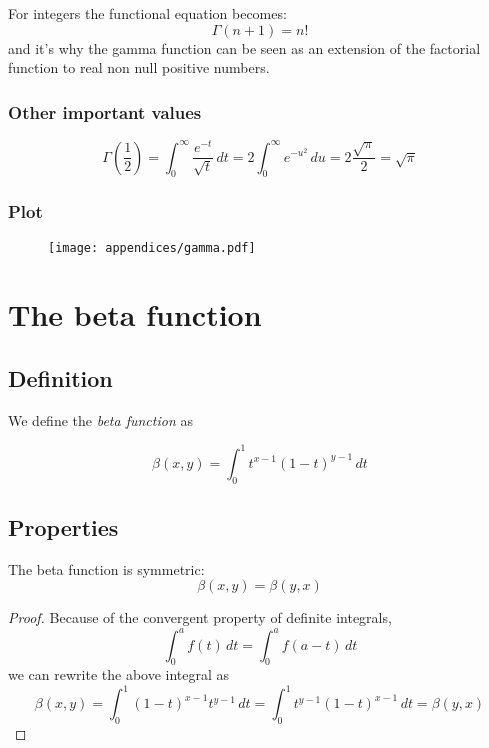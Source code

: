 For integers the functional equation becomes:
\[
    \Gamma(n + 1) = n!
\]
and it’s why the gamma function can be seen as an extension of the factorial function to real non null positive numbers.

\subsubsection{Other important values}

\[
    \Gamma\left(\frac{1}{2}\right) = \int_0^\infty \frac{e^{-t}}{\sqrt{t}} \, dt = 2\int_0^\infty e^{-u^2} \, du = 2 \frac{\sqrt{\pi}}{2} = \sqrt{\pi}
\]

\subsubsection{Plot}

\begin{figure}[H]
    \centering
	\texttt{[image: appendices/gamma.pdf]}
\end{figure}

\section{The beta function}

\subsection{Definition}

We define the \textit{beta function} as

\[
    \beta(x, y) = \int_0^1 t^{x - 1}(1 - t)^{y - 1} \, dt
\]

\subsection{Properties}

\begin{prop}
The beta function is symmetric:
\[
    \beta(x, y) = \beta(y, x)
\]
\end{prop}
\begin{proof}
    Because of the convergent property of definite integrals,
    \[
        \int_0^a f(t) \, dt = \int_0^a f(a - t) \, dt
    \]  
    we can rewrite the above integral as
    \[
        \beta(x, y) = \int_0^1 (1 - t)^{x - 1} t^{y - 1} \, dt = \int_0^1 t^{y - 1} (1 - t)^{x - 1} \, dt = \beta(y, x)
    \]
\end{proof}

